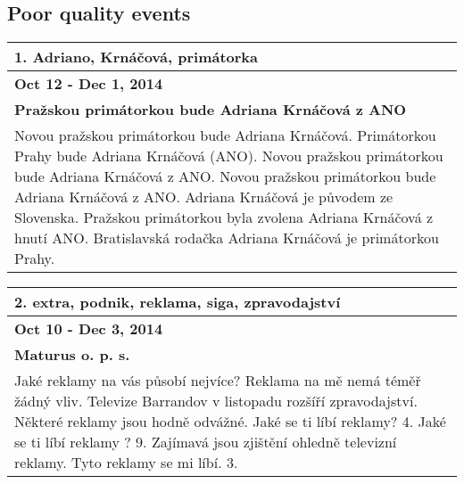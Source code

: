\subsection*{Poor quality events}
\begin{tabularx}{\linewidth}{p{\linewidth}} \toprule[1.5pt]
\bf 1. Adriano, Krnáčová, primátorka \\ \midrule
\bf Oct 12 - Dec 1, 2014 \\ \midrule
\bf Pražskou primátorkou bude Adriana Krnáčová z ANO \\
Novou pražskou primátorkou bude Adriana Krnáčová. Primátorkou Prahy bude Adriana Krnáčová (ANO). Novou pražskou primátorkou bude Adriana Krnáčová z ANO. Novou pražskou primátorkou bude Adriana Krnáčová z ANO. Adriana Krnáčová je původem ze Slovenska. Pražskou primátorkou byla zvolena Adriana Krnáčová z hnutí ANO. Bratislavská rodačka Adriana Krnáčová je primátorkou Prahy. \\ \bottomrule[1.25pt]
\end{tabularx}

\hspace{\fill}

\begin{tabularx}{\linewidth}{p{\linewidth}} \toprule[1.5pt]
\bf 2. extra, podnik, reklama, siga, zpravodajství \\ \midrule
\bf Oct 10 - Dec 3, 2014 \\ \midrule
\bf Maturus o. p. s. \\
Jaké reklamy na vás působí nejvíce? Reklama na mě nemá téměř žádný vliv. Televize Barrandov v listopadu rozšíří zpravodajství. Některé reklamy jsou hodně odvážné. Jaké se ti líbí reklamy? 4. Jaké se ti líbí reklamy ? 9. Zajímavá jsou zjištění ohledně televizní reklamy. Tyto reklamy se mi líbí. 3. \\ \bottomrule[1.25pt]
\end{tabularx}


\hspace{\fill}